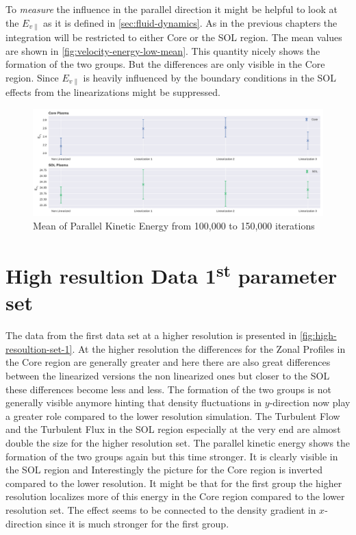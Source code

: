 \documentclass[master.tex]{subfiles}
\begin{document}
To \textit{measure} the influence in the parallel direction it might be helpful to look at the $E_{v\parallel}$ as it is defined in \autoref{sec:fluid-dynamics}.\newline
As in the previous chapters the integration will be restricted to either Core or the \ac{SOL} region. The mean values are shown in \autoref{fig:velocity-energy-low-mean}. This quantity nicely shows the formation of the two groups. But the differences are only visible in the Core region. Since $E_{v\parallel}$ is heavily influenced by the boundary conditions in the \ac{SOL} effects from the linearizations might be suppressed.

\begin{figure}[!htbp]
    \includegraphics[width=\linewidth]{pdfs/velocity-energy-low-means.pdf}
    \caption{Mean of Parallel Kinetic Energy from 100,000 to 150,000 iterations}
    \label{fig:velocity-energy-low-mean}
\end{figure}


\section{High resultion Data 1\textsuperscript{st} parameter set}
The data from the first data set at a higher resolution is presented in \autoref{fig:high-resoultion-set-1}. At the higher resolution the differences for the Zonal Profiles in the Core region are generally greater and here there are also great differences between the linearized versions the non linearized ones but closer to the \ac{SOL} these differences become less and less. The formation of the two groups is not generally visible anymore hinting that density fluctuations in $y$-direction now play a greater role compared to the lower resolution simulation. The Turbulent Flow and the Turbulent Flux in the \ac{SOL} region especially at the very end are almost double the size for the higher resolution set. The parallel kinetic energy shows the formation of the two groups again but this time stronger. It is clearly visible in the \ac{SOL} region and Interestingly the picture for the Core region is inverted compared to the lower resolution. It might be that for the first group the higher resolution localizes more of this energy in the Core region compared to the lower resolution set. The effect seems to be connected to the density gradient in $x$-direction since it is much stronger for the first group.
\end{document}
